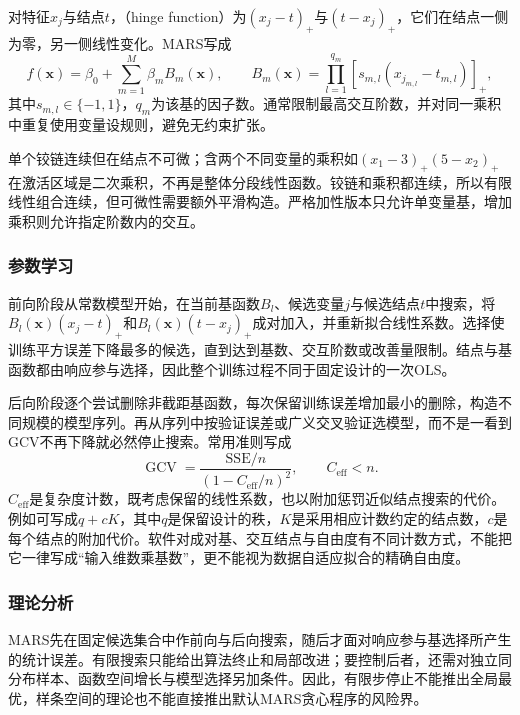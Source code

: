 对特征$x_j$与结点$t$，（hinge function）为$(x_j-t)_+$与$(t-x_j)_+$，它们在结点一侧为零，另一侧线性变化。MARS写成
\begin{equation}
  f(\bm{x})=\beta_0+\sum_{m=1}^{M}\beta_m B_m(\bm{x}),
  \qquad
  B_m(\bm{x})=\prod_{l=1}^{q_m}
                 [s_{m,l}(x_{j_{m,l}}-t_{m,l})]_+,
  \label{eq:regression-mars}
\end{equation}
其中$s_{m,l}\in\{-1,1\}$，$q_m$为该基的因子数。通常限制最高交互阶数，并对同一乘积中重复使用变量设规则，避免无约束扩张。

单个铰链连续但在结点不可微；含两个不同变量的乘积如$(x_1-3)_+(5-x_2)_+$在激活区域是二次乘积，不再是整体分段线性函数。铰链和乘积都连续，所以有限线性组合连续，但可微性需要额外平滑构造。严格加性版本只允许单变量基，增加乘积则允许指定阶数内的交互。

\subsubsection{参数学习}

前向阶段从常数模型开始，在当前基函数$B_l$、候选变量$j$与候选结点$t$中搜索，将$B_l(\bm{x})(x_j-t)_+$和$B_l(\bm{x})(t-x_j)_+$成对加入，并重新拟合线性系数。选择使训练平方误差下降最多的候选，直到达到基数、交互阶数或改善量限制。结点与基函数都由响应参与选择，因此整个训练过程不同于固定设计的一次OLS。

后向阶段逐个尝试删除非截距基函数，每次保留训练误差增加最小的删除，构造不同规模的模型序列。再从序列中按验证误差或广义交叉验证选模型，而不是一看到GCV不再下降就必然停止搜索。常用准则写成
\begin{equation}
  \operatorname{GCV}
  =\frac{\mathrm{SSE}/n}{(1-C_{\mathrm{eff}}/n)^2},
  \qquad C_{\mathrm{eff}}<n.
  \label{eq:regression-mars-gcv}
\end{equation}
$C_{\mathrm{eff}}$是复杂度计数，既考虑保留的线性系数，也以附加惩罚近似结点搜索的代价。例如可写成$q+cK$，其中$q$是保留设计的秩，$K$是采用相应计数约定的结点数，$c$是每个结点的附加代价。软件对成对基、交互结点与自由度有不同计数方式，不能把它一律写成“输入维数乘基数”，更不能视为数据自适应拟合的精确自由度。

\subsubsection{理论分析}

MARS先在固定候选集合中作前向与后向搜索，随后才面对响应参与基选择所产生的统计误差。有限搜索只能给出算法终止和局部改进；要控制后者，还需对独立同分布样本、函数空间增长与模型选择另加条件。因此，有限步停止不能推出全局最优，样条空间的理论也不能直接推出默认MARS贪心程序的风险界。

